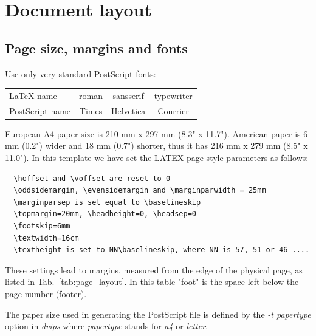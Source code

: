 
%
%
%
%
\section{Document layout}

\subsection{Page size, margins and fonts}

Use only very standard PostScript fonts: 
      \begin{tabular}{|l|ccc|} \hline
         LaTeX name & roman & sansserif & typewriter \\
         PostScript name & Times & Helvetica & Courrier \\ \hline
      \end{tabular}

  European A4 paper size is 210 mm x 297 mm (8.3" x 11.7").
  American paper is 6 mm (0.2") wider and 18 mm (0.7") shorter, 
  thus it has 216 mm x 279 mm (8.5" x 11.0").
  In this template we have set the LATEX page style parameters as follows:
{\small \begin{verbatim}
  \hoffset and \voffset are reset to 0
  \oddsidemargin, \evensidemargin and \marginparwidth = 25mm
  \marginparsep is set equal to \baselineskip
  \topmargin=20mm, \headheight=0, \headsep=0
  \footskip=6mm
  \textwidth=16cm
  \textheight is set to NN\baselineskip, where NN is 57, 51 or 46 ....
\end{verbatim} }

  These settings lead to margins, measured from the edge of the physical page, 
  as listed in Tab.~\ref{tab:page_layout}.
  In this table "foot" is the space left below the page number (footer).

  The paper size used in generating the PostScript file is defined by 
  the {\em -t papertype} option in {\em dvips} 
  where {\em papertype} stands for {\em a4} or {\em letter}.

